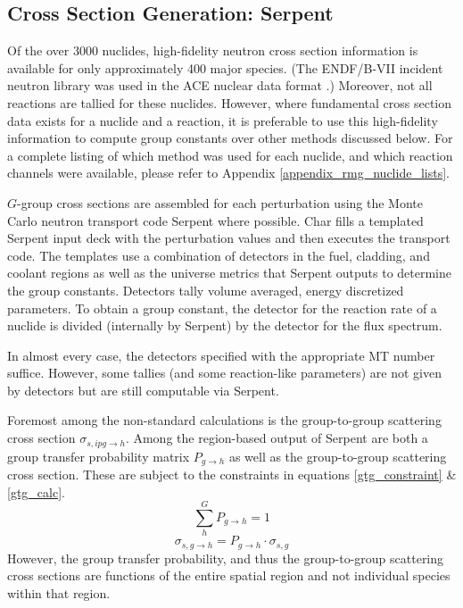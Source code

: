 \subsection{Cross Section Generation: Serpent}
\label{mg:xs_gen_serpent}
Of the over 3000 nuclides, high-fidelity neutron cross section information is available for only 
approximately 400 major species.  (The ENDF/B-VII incident neutron library was used in the ACE 
nuclear data format \cite{CHADWICK2006}.)  Moreover, not all reactions are tallied 
for these nuclides.  However, where fundamental cross section data exists for a nuclide
and a reaction, it is preferable to use this high-fidelity information to compute group
constants over other methods discussed below.  For a complete listing of which method was used for each nuclide, 
and which reaction channels were available, please refer to Appendix \ref{appendix_rmg_nuclide_lists}.

$G$-group cross sections are assembled for each perturbation using the Monte Carlo neutron
transport code Serpent \cite{Lepp2011} where possible.  Char fills a templated Serpent input deck with the
perturbation values and then executes the transport code.  The templates use a combination 
of detectors in the fuel, cladding, and coolant regions as well as the universe metrics that 
Serpent outputs to determine the group constants.  Detectors tally volume averaged, energy 
discretized parameters.  To obtain a group constant, the detector for the reaction rate of 
a nuclide is divided (internally by Serpent) by the detector for the flux spectrum.

In almost every case, the detectors specified with the appropriate MT number suffice.  
However, some tallies (and some reaction-like parameters) are not given by detectors
but are still computable via Serpent.

Foremost among the non-standard calculations is the group-to-group scattering cross section
$\sigma_{s,ipg\to h}$.  Among the region-based output of Serpent are both a group transfer
probability matrix $P_{g\to h}$ as well as the group-to-group scattering cross section.
These are subject to the constraints in equations \ref{gtg_constraint} \& \ref{gtg_calc}.
\begin{equation}
\label{gtg_constraint}
\sum_h^G P_{g\to h} = 1
\end{equation}
\begin{equation}
\label{gtg_calc}
\sigma_{s,g\to h} = P_{g\to h} \cdot \sigma_{s,g}
\end{equation}
However, the group transfer probability, and thus the group-to-group scattering cross sections
are functions of the entire spatial region and not individual species within that region.  

